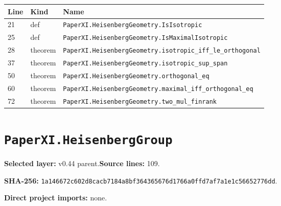 \documentclass[10pt,oneside]{book}
\begin{document}
\begin{longtable}{@{}p{}p{}p{}@{}}\toprule Line&Kind&Name\\\midrule\endhead

21&def&\nolinkurl{PaperXI.HeisenbergGeometry.IsIsotropic}\\

25&def&\nolinkurl{PaperXI.HeisenbergGeometry.IsMaximalIsotropic}\\

28&theorem&\nolinkurl{PaperXI.HeisenbergGeometry.isotropic_iff_le_orthogonal}\\

37&theorem&\nolinkurl{PaperXI.HeisenbergGeometry.isotropic_sup_span}\\

50&theorem&\nolinkurl{PaperXI.HeisenbergGeometry.orthogonal_eq}\\

60&theorem&\nolinkurl{PaperXI.HeisenbergGeometry.maximal_iff_orthogonal_eq}\\

72&theorem&\nolinkurl{PaperXI.HeisenbergGeometry.two_mul_finrank}\\

\bottomrule\end{longtable}

\section{\texorpdfstring{\nolinkurl{PaperXI.HeisenbergGroup}}{PaperXI.HeisenbergGroup}}\label{module:PaperXI.HeisenbergGroup}

\textbf{Selected layer:} v0.44 parent.\quad\textbf{Source lines:} 109.\par\textbf{SHA-256:} {\scriptsize\nolinkurl{1a146672c602d8cacb7184a8bf364365676d1766a0ffd7af7a1e1c56652776dd}}.


\textbf{Direct project imports:} none.
\end{document}
